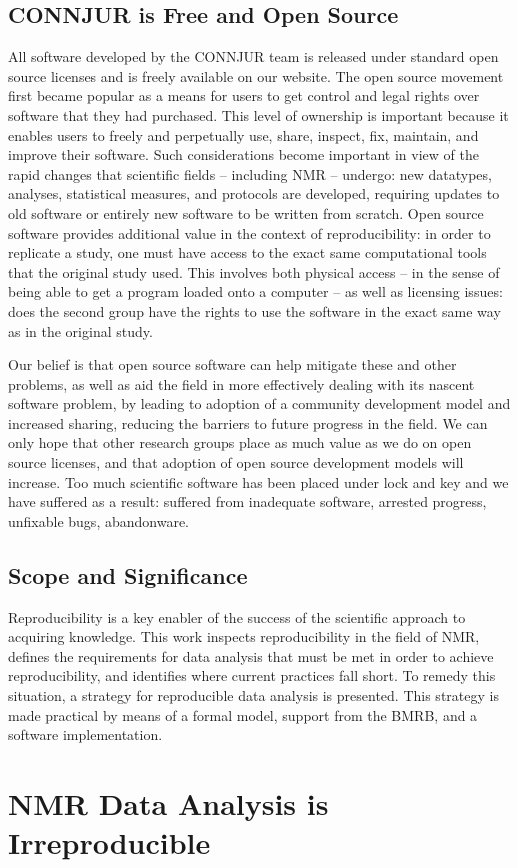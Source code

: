 \documentclass[a4paper]{report}
\begin{document}
\section{CONNJUR is Free and Open Source}
All software developed by the CONNJUR team is released under standard open 
source licenses and is freely available on our website.  The open source 
movement first became popular as a means for users to get control and legal 
rights over software that they had purchased.  This level of ownership is 
important because it enables users to freely and perpetually use, share, 
inspect, fix, maintain, and improve their software.  Such considerations 
become important in view of the rapid changes that scientific fields -- 
including NMR -- undergo: new datatypes, analyses, statistical measures, 
and protocols are developed, requiring updates to old software or entirely 
new software to be written from scratch.  Open source software provides 
additional value in the context of reproducibility: in order to replicate a
study, one must have access to the exact same computational tools that the 
original study used.  This involves both physical access -- in the sense of 
being able to get a program loaded onto a computer -- as well as licensing 
issues: does the second group have the rights to use the software in the 
exact same way as in the original study.

Our belief is that open source software can help mitigate these and other 
problems, as well as aid the field in more effectively dealing with its 
nascent software problem, by leading to adoption of a community development 
model and increased sharing, reducing the barriers to future progress in 
the field.  We can only hope that other research groups place as much value 
as we do on open source licenses, and that adoption of open source development 
models will increase.  Too much scientific software has been placed under lock 
and key and we have suffered as a result: suffered from inadequate software, 
arrested progress, unfixable bugs, abandonware.


\section{Scope and Significance}
Reproducibility is a key enabler of the success of the scientific approach to 
acquiring knowledge.  This work inspects reproducibility in the field of NMR, 
defines the requirements for data analysis that must be met in order to achieve 
reproducibility, and identifies where current practices fall short.  To remedy 
this situation, a strategy for reproducible data analysis is presented.  This 
strategy is made practical by means of a formal model, support from the BMRB, 
and a software implementation.





\chapter{NMR Data Analysis is Irreproducible}

%


\end{document}
